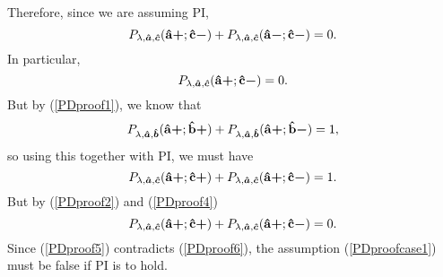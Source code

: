  Therefore, since we are assuming PI, 
 \begin{equation}
 P_{\lambda,\bm{\hat{a}},\bm{\hat{c}}}(\vb{\hat{{a}}}\bm{+};\vb{\hat{{c}}}\bm{-})+P_{\lambda,\bm{\hat{a}},\bm{\hat{c}}}(\vb{\hat{{a}}}\bm{-};\vb{\hat{{c}}}\bm{-})=0.
\end{equation}
 In particular, 
  \begin{equation}\label{PDproof4}
  P_{\lambda,\bm{\hat{a}},\bm{\hat{c}}}(\vb{\hat{{a}}}\bm{+};\vb{\hat{{c}}}\bm{-})=0.
  \end{equation}
  But by (\ref{PDproof1}), we know that 
  \begin{equation}
  P_{\lambda,\bm{\hat{a}},\bm{\hat{b}}}(\vb{\hat{{a}}}\bm{+};\vb{\hat{{b}}}\bm{+})+P_{\lambda,\bm{\hat{a}},\bm{\hat{b}}}(\vb{\hat{{a}}}\bm{+};\vb{\hat{{b}}}\bm{-})=1,
  \end{equation}
  so using this together with PI, we must have
    \begin{equation}\label{PDproof5}
  P_{\lambda,\bm{\hat{a}},\bm{\hat{c}}}(\vb{\hat{{a}}}\bm{+};\vb{\hat{{c}}}\bm{+})+P_{\lambda,\bm{\hat{a}},\bm{\hat{c}}}(\vb{\hat{{a}}}\bm{+};\vb{\hat{{c}}}\bm{-})=1.
  \end{equation}
 But by (\ref{PDproof2}) and (\ref{PDproof4})
\begin{equation}\label{PDproof6}
  P_{\lambda,\bm{\hat{a}},\bm{\hat{c}}}(\vb{\hat{{a}}}\bm{+};\vb{\hat{{c}}}\bm{+})+P_{\lambda,\bm{\hat{a}},\bm{\hat{c}}}(\vb{\hat{{a}}}\bm{+};\vb{\hat{{c}}}\bm{-})=0.
\end{equation}
Since (\ref{PDproof5}) contradicts (\ref{PDproof6}), the assumption (\ref{PDproofcase1}) must be false if PI is to hold.

